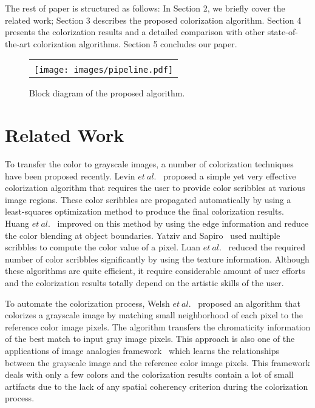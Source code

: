 \documentclass[twocolumn]{svjour3}          %
\begin{document}
The rest of paper is structured as follows: In Section 2, we briefly cover the related work; Section 3 describes the proposed colorization algorithm. Section 4 presents the colorization results and a detailed comparison with other state-of-the-art colorization algorithms. Section 5 concludes our paper.


\begin{figure*}\center
\begin{minipage}[t]{\linewidth}
\centering
\begin{tabular}{c@{\hspace{0mm}}}
\\\vspace{0mm}\\
\texttt{[image: images/pipeline.pdf]}
\end{tabular}
\end{minipage}
 \caption{Block diagram of the proposed algorithm.}
\label{fig:pipeline}
\end{figure*}

\section{Related Work}
\label{sec:2}
To transfer the color to grayscale images, a number of colorization techniques have been proposed recently. Levin $et\ al.$~\cite{Levin04} proposed a simple yet very effective colorization algorithm that requires the user to provide color scribbles at various image regions. These color scribbles are propagated automatically by using a least-squares optimization method to produce the final colorization results. Huang $et\ al.$~\cite{Huang05} improved on this method by using the edge information and reduce the color blending at object boundaries. Yatziv and Sapiro~\cite{Yatziv06} used multiple scribbles to compute the color value of a pixel. Luan $et\ al.$~\cite{Luan07} reduced the required number of color scribbles significantly by using the texture information. Although these algorithms are quite efficient, it require considerable amount of user efforts and the colorization results totally depend on the artistic skills of the user. 

To automate the colorization process, Welsh $et\ al.$~\cite{Welsh02} proposed an algorithm that colorizes a grayscale image by matching small neighborhood of each pixel to the reference color image pixels. The algorithm transfers the chromaticity information of the best match to input gray image pixels. This approach is also one of the applications of image analogies framework~\cite{Aaron01} which learns the relationships between the grayscale image and the reference color image pixels. This framework deals with only a few colors and the colorization results contain a lot of small artifacts due to the lack of any spatial coherency criterion during the colorization process.
\end{document}
